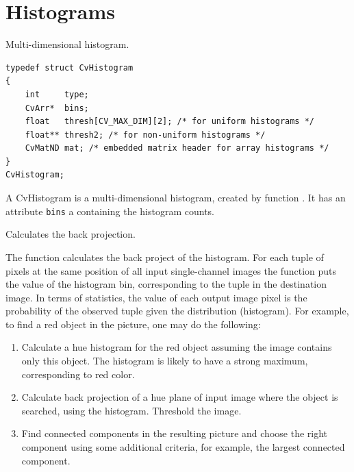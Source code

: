 \section{Histograms}

\ifCPy

\label{CvHistogram}
Multi-dimensional histogram.

\ifC
\begin{lstlisting}
typedef struct CvHistogram
{
    int     type;
    CvArr*  bins;
    float   thresh[CV_MAX_DIM][2]; /* for uniform histograms */
    float** thresh2; /* for non-uniform histograms */
    CvMatND mat; /* embedded matrix header for array histograms */
}
CvHistogram;
\end{lstlisting}
\fi

\ifPy
A CvHistogram is a multi-dimensional histogram, created by function .  It has an attribute \texttt{bins} a  containing the histogram counts.
\fi

Calculates the back projection.


\begin{description}
\end{description}

The function calculates the back project of the histogram. For each tuple of pixels at the same position of all input single-channel images the function puts the value of the histogram bin, corresponding to the tuple in the destination image. In terms of statistics, the value of each output image pixel is the probability of the observed tuple given the distribution (histogram). For example, to find a red object in the picture, one may do the following:

\begin{enumerate}
 \item Calculate a hue histogram for the red object assuming the image contains only this object. The histogram is likely to have a strong maximum, corresponding to red color.
 \item Calculate back projection of a hue plane of input image where the object is searched, using the histogram. Threshold the image.
 \item Find connected components in the resulting picture and choose the right component using some additional criteria, for example, the largest connected component.
\end{enumerate}

